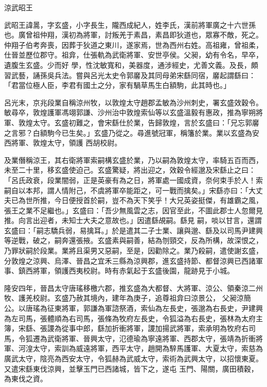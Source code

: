 
\begin{pinyinscope}
涼武昭王



 武昭王諱暠，字玄盛，小字長生，隴西成紀人，姓李氏，漢前將軍廣之十六世孫也。廣曾祖仲翔，漢初為將軍，討叛羌于素昌，素昌即狄道也，眾寡不敵，死之。仲翔子伯考奔喪，因葬于狄道之東川，遂家焉，世為西州右姓。高祖雍，曾祖柔，仕晉並歷位郡守。祖弇，仕張軌為武衛將軍、安世亭侯。父昶，幼有令名，早卒，遺腹生玄盛。少而好
 學，性沈敏寬和，美器度，通涉經史，尤善文義。及長，頗習武藝，誦孫吳兵法。嘗與呂光太史令郭黁及其同母弟宋繇同宿，黁起謂繇曰：「君當位極人臣，李君有國土之分，家有騧草馬生白額駒，此其時也。」



 呂光末，京兆段業自稱涼州牧，以敦煌太守趙郡孟敏為沙州刺史，署玄盛效穀令。敏尋卒，敦煌護軍馮翊郭謙、沙州治中敦煌索仙等以玄盛溫毅有惠政，推為寧朔將軍、敦煌太守。玄盛初難之，會宋繇仕於業，告歸敦煌，言於玄盛曰：「兄忘郭黁之言邪？白額駒今已生矣。」玄盛乃從之。尋進號冠軍，稱籓於業。業以玄盛為安西將軍、敦煌太守，領護
 西胡校尉。



 及業僭稱涼王，其右衛將軍索嗣構玄盛於業，乃以嗣為敦煌太守，率騎五百而西，未至二十里，移玄盛使迫己。玄盛驚疑，將出迎之，效穀令經邈及宋繇止之曰：「呂氏政衰，段業闇弱，正是英豪有為之日，將軍處一國成資，奈何束手於人！索嗣自以本邦，謂人情附己，不虞將軍卒能距之，可一戰而擒矣。」宋繇亦曰：「大丈夫已為世所推，今日便授首於嗣，豈不為天下笑乎！大兄英姿挺傑，有雄霸之風，張王之業不足繼也。」玄盛曰：「吾少無風雲之志，因官至此，不圖此郡士人忽爾見推。向言出迎者，未知士大夫之意故也。」因遣繇覘嗣。繇見
 嗣，啖以甘言，還謂玄盛曰：「嗣志驕兵弱，易擒耳。」於是遣其二子士業、讓與邈、繇及以司馬尹建興等逆戰，破之，嗣奔還張掖。玄盛素與嗣善，結為刎頸交，反為所構，故深恨之，乃罪狀嗣於段業。業將且渠男又惡嗣，至是，因勸除之。業乃殺嗣，遣使謝玄盛，分敦煌之涼興、烏澤、晉昌之宜禾三縣為涼興郡，進玄盛持節、都督涼興已西諸軍事、鎮西將軍，領護西夷校尉。時有赤氣起于玄盛後園，龍跡見于小城。



 隆安四年，晉昌太守唐瑤移檄六郡，推玄盛為大都督、大將軍、涼公、領秦涼二州牧、護羌校尉。玄盛乃赦其境內，建年為庚子，追尊祖弇曰涼景公，
 父昶涼簡公。以唐瑤為征東將軍，郭謙為軍諮祭酒，索仙為左長史，張邈為右長史，尹建興為左司馬，張體順為右司馬，張條為牧府左長史，令狐溢為右長史，張林為太府主簿，宋繇、張謖為從事中郎，繇加折衝將軍，謖加揚武將軍，索承明為牧府右司馬，令狐遷為武衛將軍、晉興太守，氾德瑜為寧遠將軍、西郡太守，張靖為折衝將軍、河湟太守，索訓為威遠將軍，西平太守，趙開為騂馬護軍、大夏太守，索慈為廣武太守，陰亮為西安太守，令狐赫為武威太守，索術為武興太守，以招懷東夏。又遣宋繇東伐涼興，並擊玉門已西諸城，皆下之，遂屯
 玉門、陽關，廣田積穀，為東伐之資。




\end{pinyinscope}

